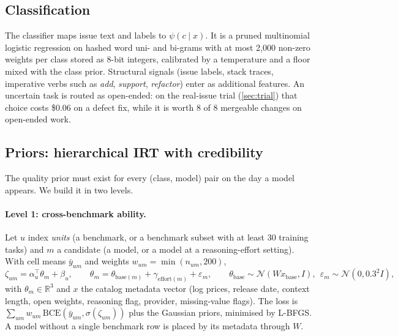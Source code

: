\documentclass[11pt,a4paper]{article}
\theoremstyle{definition}
\theoremstyle{remark}
\theoremstyle{definition}
\newcommand{\R}{\mathbb{R}}
\begin{document}
\subsection{Classification}
The classifier maps issue text and labels to $\psi(c\mid x)$. It is a pruned multinomial logistic regression on hashed word uni- and bi-grams with at most 2{,}000 non-zero weights per class stored as 8-bit integers, calibrated by a temperature and a floor mixed with the class prior. Structural signals (issue labels, stack traces, imperative verbs such as \emph{add}, \emph{support}, \emph{refactor}) enter as additional features. An uncertain task is routed as open-ended: on the real-issue trial (\cref{sec:trial}) that choice costs \$0.06 on a defect fix, while it is worth 8 of 8 mergeable changes on open-ended work.

\subsection{Priors: hierarchical IRT with credibility}
\label{sec:priors}

The quality prior must exist for every (class, model) pair on the day a model appears. We build it in two levels.

\paragraph{Level 1: cross-benchmark ability.}
Let $u$ index \emph{units} (a benchmark, or a benchmark subset with at least 30 training tasks) and $m$ a candidate (a model, or a model at a reasoning-effort setting). With cell means $\bar y_{um}$ and weights $w_{um}=\min(n_{um},200)$,
\begin{equation}
\zeta_{um}=\alpha_u^\top\theta_m+\beta_u,\qquad
\theta_m=\theta_{\mathrm{base}(m)}+\gamma_{\mathrm{effort}(m)}+\varepsilon_m,\qquad
\theta_{\mathrm{base}}\sim\mathcal N(Wx_{\mathrm{base}},I),\ \ \varepsilon_m\sim\mathcal N(0,0.3^2 I),
\label{eq:level1}
\end{equation}
with $\theta_m\in\R^3$ and $x$ the catalog metadata vector (log prices, release date, context length, open weights, reasoning flag, provider, missing-value flags). The loss is $\sum_{um}w_{um}\,\mathrm{BCE}(\bar y_{um},\sigma(\zeta_{um}))$ plus the Gaussian priors, minimised by L-BFGS. A model without a single benchmark row is placed by its metadata through $W$.
\end{document}
